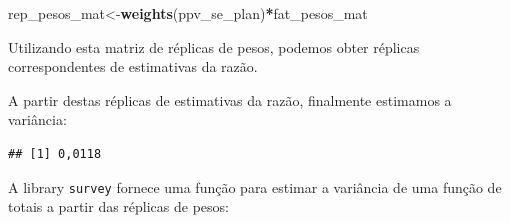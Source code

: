 \documentclass[]{book}
\newenvironment{Shaded}{\begin{snugshade}}{\end{snugshade}}
\newcommand{\KeywordTok}[1]{\textcolor[rgb]{0.13,0.29,0.53}{\textbf{#1}}}
\newcommand{\DecValTok}[1]{\textcolor[rgb]{0.00,0.00,0.81}{#1}}
\newcommand{\StringTok}[1]{\textcolor[rgb]{0.31,0.60,0.02}{#1}}
\newcommand{\ControlFlowTok}[1]{\textcolor[rgb]{0.13,0.29,0.53}{\textbf{#1}}}
\newcommand{\OperatorTok}[1]{\textcolor[rgb]{0.81,0.36,0.00}{\textbf{#1}}}
\newcommand{\NormalTok}[1]{#1}
\theoremstyle{definition}
\theoremstyle{definition}
\theoremstyle{definition}
\theoremstyle{remark}
\begin{document}
\begin{Shaded}
\begin{Highlighting}[]
\NormalTok{rep_pesos_mat<-}\KeywordTok{weights}\NormalTok{(ppv_se_plan)}\OperatorTok{*}\NormalTok{fat_pesos_mat}
\end{Highlighting}
\end{Shaded}

Utilizando esta matriz de réplicas de pesos, podemos obter réplicas
correspondentes de estimativas da razão.

\begin{Shaded}
\end{Shaded}

A partir destas réplicas de estimativas da razão, finalmente estimamos a
variância:

\begin{Shaded}
\end{Shaded}

\begin{verbatim}
## [1] 0,0118
\end{verbatim}

A library \texttt{survey} \citep{R-survey} fornece uma função para
estimar a variância de uma função de totais a partir das réplicas de
pesos:
\end{document}
